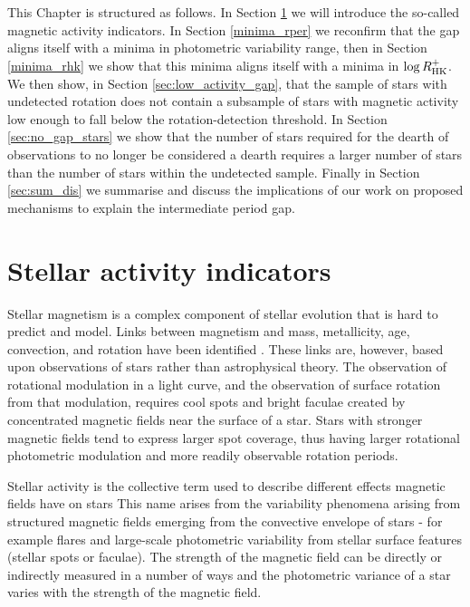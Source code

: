  
This Chapter is structured as follows. In Section \ref{sec:act_ind} we will introduce the so-called magnetic activity indicators. 
In Section \ref{minima_rper} we reconfirm that the gap aligns itself with a minima in photometric variability range, then in Section \ref{minima_rhk} we show that this minima aligns itself with a minima in $\log R^{+}_{\rm{HK}}$.
We then show, in Section \ref{sec:low_activity_gap}, that the sample of stars with undetected rotation does not contain a subsample of stars with magnetic activity low enough to fall below the rotation-detection threshold.
In Section \ref{sec:no_gap_stars} we show that the number of stars required for the dearth of observations to no longer be considered a dearth requires a larger number of stars than the number of stars within the undetected sample.
Finally in Section \ref{sec:sum_dis} we summarise and discuss the implications of our work on proposed mechanisms to explain the intermediate period gap.


\section{Stellar activity indicators}
\label{sec:act_ind}

Stellar magnetism is a complex component of stellar evolution that is hard to predict and model.
Links between magnetism and mass, metallicity, age, convection, and rotation have been identified \citep{cao_starspots_2022}.
These links are, however, based upon observations of stars rather than astrophysical theory.
The observation of rotational modulation in a light curve, and the observation of surface rotation from that modulation, requires cool spots and bright faculae created by concentrated magnetic fields near the surface of a star.
Stars with stronger magnetic fields tend to express larger spot coverage, thus having larger rotational photometric modulation and more readily observable rotation periods.

Stellar activity is the collective term used to describe different effects magnetic fields have on stars
This name arises from the variability phenomena arising from structured magnetic fields emerging from the convective envelope of stars - for example flares and large-scale photometric variability from stellar surface features (stellar spots or faculae).
The strength of the magnetic field can be directly or indirectly measured in a number of ways and the photometric variance of a star varies with the strength of the magnetic field.

